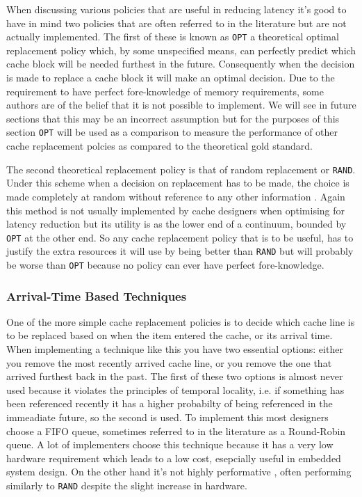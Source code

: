 When discussing various policies that are useful in reducing latency it's good to have in mind two policies that are often referred to in the literature but are not actually implemented. The first of these is known as \texttt{OPT} \cite{jeongOptimalReplacementsCaches1999} a theoretical optimal replacement policy which, by some unspecified means, can perfectly predict which cache block will be needed furthest in the future. Consequently when the decision is made to replace a cache block it will make an optimal decision. Due to the requirement to have perfect fore-knowledge of memory requirements, some authors \cite{jeongOptimalReplacementsCaches1999, pandaSurveyReplacementStrategies2016} are of the belief that it is not possible to implement. We will see in future sections that this may be an incorrect assumption but for the purposes of this section \texttt{OPT} will be used as a comparison to measure the performance of other cache replacement polcies as compared to the theoretical gold standard.

The second theoretical replacement policy is that of random replacement or \texttt{RAND}. Under this scheme when a decision on replacement has to be made, the choice is made completely at random without reference to any other information \cite{beladyStudyReplacementAlgorithms1966}. Again this method is not usually implemented by cache designers when optimising for latency reduction \cite{karedlaCachingStrategiesImprove1994} but its utility is as the lower end of a continuum, bounded by \texttt{OPT} at the other end. So any cache replacement policy that is to be useful, has to justify the extra resources it will use by being better than \texttt{RAND} but will probably be worse than \texttt{OPT} because no policy can ever have perfect fore-knowledge.

\subsubsection{Arrival-Time Based Techniques}

One of the more simple cache replacement policies is to decide which cache line is to be replaced based on when the item entered the cache, or its arrival time. When implementing a technique like this you have two essential options: either you remove the most recently arrived cache line, or you remove the one that arrived furthest back in the past. The first of these two options is almost never used because it violates the principles of temporal locality, i.e. if something has been referenced recently it has a higher probabilty of being referenced in the immeadiate future, so the second is used. To implement this most designers choose a FIFO queue, sometimes referred to in the literature as a Round-Robin queue. A lot of implementers choose this technique because it has a very low hardware requirement \cite{pandaSurveyReplacementStrategies2016} which leads to a low cost, esepcially useful in embedded system design. On the other hand it's not highly performative \cite{al-zoubiPerformanceEvaluationCache2004}, often performing similarly to \texttt{RAND} despite the slight increase in hardware. 

